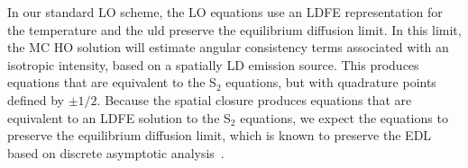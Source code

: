 In our standard LO scheme, the
LO equations use an LDFE representation for the temperature and the uld preserve the equilibrium diffusion limit.  In this limit, the MC HO
solution will estimate angular consistency terms associated with an isotropic intensity,
based on a spatially LD emission source.  This produces equations that are equivalent to
the S$_2$ equations, but with quadrature points defined by $\pm 1/2$.  Because the spatial closure produces equations that are equivalent to an LDFE
solution to the S$_2$ equations, we expect the equations to preserve the equilibrium diffusion
limit, which is known to preserve the EDL based on discrete asymptotic analysis~\cite{morel_ldtrt}.
